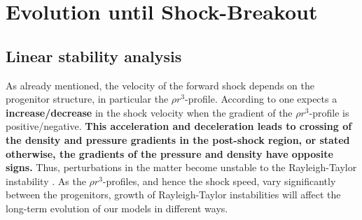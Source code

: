 \documentclass[fleqn,usenatbib]{mnras}
\begin{document}
\section{Evolution until Shock-Breakout}
\label{sec:Evolution until Shock-Breakout}
\subsection{Linear stability analysis}
\label{sec:Linear stability analysis}
As already mentioned, the velocity of the forward shock depends on the progenitor structure, in particular the $\rho r^3$-profile. According to \cite{Sedov1961} one expects a \textbf{increase/decrease} in the shock velocity when the gradient of the $\rho r^3$-profile is positive/negative. 
\textbf{This acceleration and deceleration leads to crossing of the density and pressure gradients in the post-shock region, or stated otherwise, the gradients of the pressure and density have opposite signs.} Thus, perturbations in the matter become unstable to the Rayleigh-Taylor instability \citep{Rayleigh1882,Chevalier1978}. As the $\rho r^3 $-profiles, and hence the shock speed, vary significantly between the progenitors, growth of Rayleigh-Taylor instabilities will affect the long-term evolution of our models in different ways.
\end{document}
